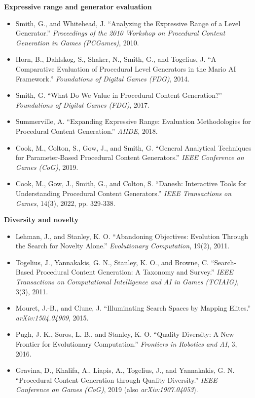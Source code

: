 \documentclass[]{article}
\begin{document}
        \textbf{Expressive range and generator evaluation}

        \begin{itemize}
            \item Smith, G., and Whitehead, J. ``Analyzing the Expressive Range of a Level Generator.'' \textit{Proceedings of the 2010 Workshop on Procedural Content Generation in Games (PCGames)}, 2010.
            \item Horn, B., Dahlskog, S., Shaker, N., Smith, G., and Togelius, J. ``A Comparative Evaluation of Procedural Level Generators in the Mario AI Framework.'' \textit{Foundations of Digital Games (FDG)}, 2014.
            \item Smith, G. ``What Do We Value in Procedural Content Generation?'' \textit{Foundations of Digital Games (FDG)}, 2017.
            \item Summerville, A. ``Expanding Expressive Range: Evaluation Methodologies for Procedural Content Generation.'' \textit{AIIDE}, 2018.
            \item Cook, M., Colton, S., Gow, J., and Smith, G. ``General Analytical Techniques for Parameter-Based Procedural Content Generators.'' \textit{IEEE Conference on Games (CoG)}, 2019.
            \item Cook, M., Gow, J., Smith, G., and Colton, S. ``Danesh: Interactive Tools for Understanding Procedural Content Generators.'' \textit{IEEE Transactions on Games}, 14(3), 2022, pp. 329-338.
        \end{itemize}
        
        \textbf{Diversity and novelty}

        \begin{itemize}
            \item Lehman, J., and Stanley, K. O. ``Abandoning Objectives: Evolution Through the Search for Novelty Alone.'' \textit{Evolutionary Computation}, 19(2), 2011.
            \item Togelius, J., Yannakakis, G. N., Stanley, K. O., and Browne, C. ``Search-Based Procedural Content Generation: A Taxonomy and Survey.'' \textit{IEEE Transactions on Computational Intelligence and AI in Games (TCIAIG)}, 3(3), 2011.
            \item Mouret, J.-B., and Clune, J. ``Illuminating Search Spaces by Mapping Elites.'' \textit{arXiv:1504.04909}, 2015.
            \item Pugh, J. K., Soros, L. B., and Stanley, K. O. ``Quality Diversity: A New Frontier for Evolutionary Computation.'' \textit{Frontiers in Robotics and AI}, 3, 2016.
            \item Gravina, D., Khalifa, A., Liapis, A., Togelius, J., and Yannakakis, G. N. ``Procedural Content Generation through Quality Diversity.'' \textit{IEEE Conference on Games (CoG)}, 2019 (also \textit{arXiv:1907.04053}).
        \end{itemize}
        
\end{document}
